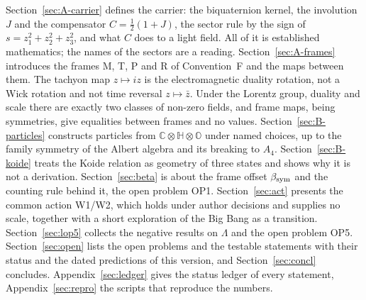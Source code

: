 Section~\ref{sec:A-carrier} defines the carrier: the biquaternion kernel, the involution $J$ and the
compensator $C=\tfrac12(1+J)$, the sector rule by the sign of $s=z_1^2+z_2^2+z_3^2$, and what $C$
does to a light field. All of it is established mathematics; the names of the sectors are a reading.
Section~\ref{sec:A-frames} introduces the frames M, T, P and R of Convention~F and the maps between
them. The tachyon map $z\mapsto iz$ is the electromagnetic duality rotation, not a Wick rotation and
not time reversal $z\mapsto\bar z$. Under the Lorentz group, duality and scale there are exactly two
classes of non-zero fields, and frame maps, being symmetries, give equalities between frames and no
values. Section~\ref{sec:B-particles} constructs particles from $\mathbb C\otimes\mathbb H\otimes\mathbb O$ under named
choices, up to the family symmetry of the Albert algebra and its breaking to $A_4$. Section~\ref{sec:B-koide} treats
the Koide relation as geometry of three states and shows why it is not a derivation. Section~\ref{sec:beta} is about
the frame offset $\beta_{\mathrm{sym}}$ and the counting rule behind it, the open problem OP1. Section~\ref{sec:act} presents the
common action W1/W2, which holds under author decisions and supplies no scale, together with a short
exploration of the Big Bang as a transition. Section~\ref{sec:lop5} collects the negative results on $\Lambda$ and
the open problem OP5. Section~\ref{sec:open} lists the open problems and the testable statements with their status and the dated predictions of this version,
and Section~\ref{sec:concl} concludes. Appendix~\ref{sec:ledger} gives the status ledger of every statement, Appendix~\ref{sec:repro} the scripts
that reproduce the numbers.
